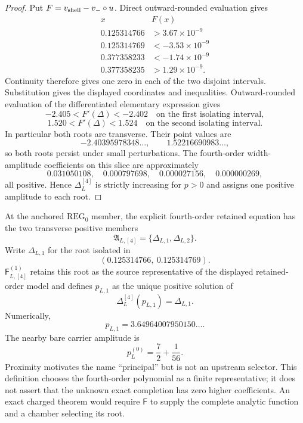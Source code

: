 \documentclass[12pt,a4paper]{article}
\begin{document}
\begin{proof}
Put \(F=v_{\rm shell}-v_-\circ u\).  Direct outward-rounded evaluation gives
\[
\begin{array}{c|r}
x&F(x)\\
\hline
0.125314766&>3.67\times10^{-9}\\
0.125314769&<-3.53\times10^{-9}\\
0.377358233&<-1.74\times10^{-9}\\
0.377358235&>1.29\times10^{-9}.
\end{array}
\]
Continuity therefore gives one zero in each of the two disjoint intervals.
Substitution gives the displayed coordinates and inequalities.
Outward-rounded evaluation of the differentiated elementary expression gives
\[
-2.405<F'(\Delta)<-2.402
\quad\text{on the first isolating interval},
\]
\[
1.520<F'(\Delta)<1.524
\quad\text{on the second isolating interval}.
\]
In particular both roots are transverse.  Their point values are
\[
-2.40395978348\ldots,
\qquad
1.52216690983\ldots,
\]
so both roots persist under small perturbations.  The fourth-order
width-amplitude coefficients on this slice are approximately
\[
0.031050108,\quad
0.000797698,\quad
0.000027156,\quad
0.000000269,
\]
all positive.  Hence \(\Delta_L^{[4]}\) is strictly increasing for \(p>0\)
and assigns one positive amplitude to each root.
\end{proof}

\begin{definition}
\label{p6:def:principal-charged-branch}
At the anchored \(\mathrm{REG}_0\) member, the explicit fourth-order
retained equation has the two transverse positive members
\[
\boxed{
\mathfrak A_{L,[4]}=\{\Delta_{L,1},\Delta_{L,2}\}.
}
\]
Write \(\Delta_{L,1}\) for the root isolated in
\[
(0.125314766,\ 0.125314769).
\]
\(\mathsf F_{L,[4]}^{(1)}\) retains this root as the source representative of the
displayed retained-order model and defines \(p_{L,1}\) as the unique positive
solution of
\[
\Delta_L^{[4]}(p_{L,1})=\Delta_{L,1}.
\]
Numerically,
\[
p_{L,1}=3.64964007950150\ldots .
\]
The nearby bare carrier amplitude is
\[
p_L^{(0)}=\frac72+\frac1{56}.
\]
Proximity motivates the name ``principal'' but is not an upstream selector.
This definition chooses the fourth-order polynomial as a finite
representative; it does not assert that the unknown exact completion has
zero higher coefficients.  An exact charged theorem would require
\(\mathsf F\) to supply the complete analytic function and a chamber
selecting its root.
\end{definition}
\end{document}
